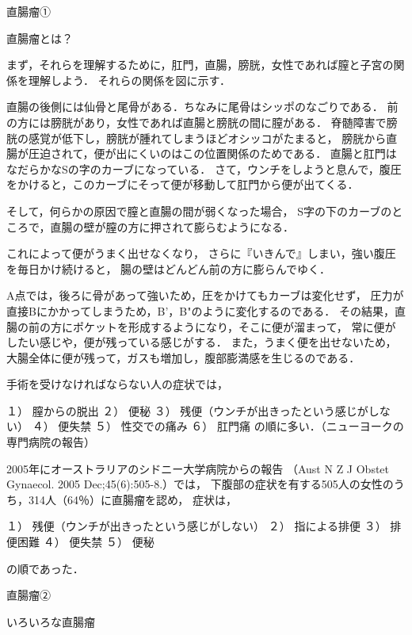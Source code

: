 直腸瘤①




直腸瘤とは？


まず，それらを理解するために，肛門，直腸，膀胱，女性であれば膣と子宮の関係を理解しよう．
それらの関係を図に示す．





直腸の後側には仙骨と尾骨がある．ちなみに尾骨はシッポのなごりである．
前の方には膀胱があり，女性であれば直腸と膀胱の間に膣がある．
脊髄障害で膀胱の感覚が低下し，膀胱が腫れてしまうほどオシッコがたまると，
膀胱から直腸が圧迫されて，便が出にくいのはこの位置関係のためである．
直腸と肛門はなだらかなSの字のカーブになっている．
さて，ウンチをしようと息んで，腹圧をかけると，このカーブにそって便が移動して肛門から便が出てくる．





そして，何らかの原因で膣と直腸の間が弱くなった場合，
S字の下のカーブのところで，直腸の壁が膣の方に押されて膨らむようになる．





これによって便がうまく出せなくなり，
さらに『いきんで』しまい，強い腹圧を毎日かけ続けると，
腸の壁はどんどん前の方に膨らんでゆく．




A点では，後ろに骨があって強いため，圧をかけてもカーブは変化せず，
圧力が直接Bにかかってしまうため，B'，B"のように変化するのである．
その結果，直腸の前の方にポケットを形成するようになり，そこに便が溜まって，
常に便がしたい感じや，便が残っている感じがする．
また，うまく便を出せないため，大腸全体に便が残って，ガスも増加し，腹部膨満感を生じるのである．

手術を受けなければならない人の症状では， 

１） 膣からの脱出
２） 便秘
３） 残便（ウンチが出きったという感じがしない）
４） 便失禁
５） 性交での痛み
６） 肛門痛
の順に多い．（ニューヨークの専門病院の報告）

2005年にオーストラリアのシドニー大学病院からの報告
（Aust N Z J Obstet Gynaecol. 2005 Dec;45(6):505-8.）では，
下腹部の症状を有する505人の女性のうち，314人（64％）に直腸瘤を認め， 症状は， 

１） 残便（ウンチが出きったという感じがしない）
２） 指による排便
３） 排便困難
４） 便失禁
５） 便秘

の順であった．

直腸瘤②

いろいろな直腸瘤

